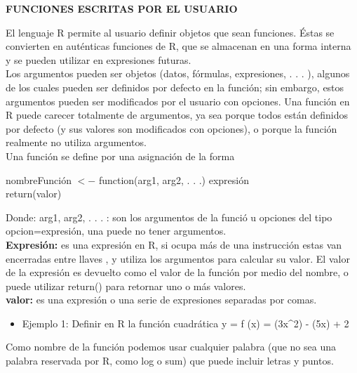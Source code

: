 \documentclass[12pt,letterpaper]{article}\usepackage[]{graphicx}\usepackage[]{color}
\begin{document}
\begin{center}
\textbf{FUNCIONES ESCRITAS POR EL USUARIO}
\end{center}

El lenguaje R permite al usuario definir objetos que sean funciones. \'Estas se convierten en aut\'enticas funciones de R, que se almacenan en una forma interna y se pueden utilizar en expresiones futuras.\\

Los argumentos pueden ser objetos (datos, f\'ormulas, expresiones, . . . ), algunos de los cuales pueden ser definidos por defecto en la funci\'on; sin embargo, estos argumentos pueden ser modificados por el usuario con opciones. Una funci\'on en R puede carecer totalmente de argumentos, ya sea porque todos est\'an definidos por defecto (y sus valores son modificados con opciones), o porque la funci\'on realmente no utiliza argumentos.\\

Una funci\'on se define por una asignaci\'on de la forma
\begin{center}
 nombreFunci\'on $<-$ function(arg1, arg2, . . .) expresi\'on\\
 return(valor) 
\end{center}

Donde: arg1, arg2, . . . : son los argumentos de la funci\'o u opciones del tipo opcion=expresi\'on, una puede no tener argumentos.\\

\textbf{Expresi\'on:} es una expresi\'on en R, si ocupa m\'as de una instrucci\'on estas van encerradas entre llaves {}, y utiliza los argumentos para calcular su valor. El valor de la expresi\'on es devuelto como el valor de la funci\'on por medio del nombre, o puede utilizar return() para retornar uno o m\'as valores.\\ 

\textbf{valor:} es una expresi\'on o una serie de expresiones separadas por comas.\\

\begin {itemize}
\item Ejemplo 1: Definir en R la funci\'on cuadr\'atica y = f (x) = (3x^2) - (5x) + 2
\end {itemize}

Como nombre de la funci\'on podemos usar cualquier palabra (que no sea una palabra reservada por R, como log o sum) que puede incluir letras y puntos.\\
\end{document}
